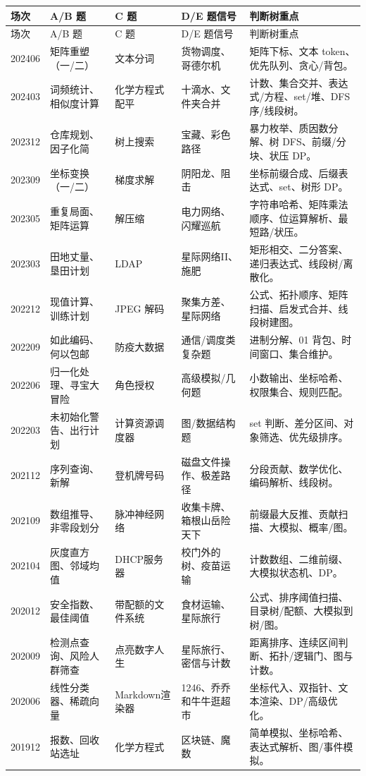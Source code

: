 \begingroup
\small
\setlength{\tabcolsep}{3pt}
\begin{longtable}{p{1.55cm}p{2.8cm}p{2.8cm}p{3.35cm}p{4.6cm}}
\toprule
场次 & A/B 题 & C 题 & D/E 题信号 & 判断树重点 \\
\midrule
\endfirsthead
\toprule
场次 & A/B 题 & C 题 & D/E 题信号 & 判断树重点 \\
\midrule
\endhead
202406 & 矩阵重塑（一/二） & 文本分词 & 货物调度、哥德尔机 & 矩阵下标、文本 token、优先队列、贪心/背包。 \\
202403 & 词频统计、相似度计算 & 化学方程式配平 & 十滴水、文件夹合并 & 计数、集合交并、表达式/方程、set/堆、DFS 序/线段树。 \\
202312 & 仓库规划、因子化简 & 树上搜索 & 宝藏、彩色路径 & 暴力枚举、质因数分解、树 DFS、前缀/分块、状压 DP。 \\
202309 & 坐标变换（一/二） & 梯度求解 & 阴阳龙、阻击 & 坐标前缀合成、后缀表达式、set、树形 DP。 \\
202305 & 重复局面、矩阵运算 & 解压缩 & 电力网络、闪耀巡航 & 字符串哈希、矩阵乘法顺序、位运算解析、最短路/状压。 \\
202303 & 田地丈量、垦田计划 & LDAP & 星际网络II、施肥 & 矩形相交、二分答案、递归表达式、线段树/离散化。 \\
202212 & 现值计算、训练计划 & JPEG 解码 & 聚集方差、星际网络 & 公式、拓扑顺序、矩阵扫描、启发式合并、线段树建图。 \\
202209 & 如此编码、何以包邮 & 防疫大数据 & 通信/调度类复杂题 & 进制分解、01 背包、时间窗口、集合维护。 \\
202206 & 归一化处理、寻宝大冒险 & 角色授权 & 高级模拟/几何题 & 小数输出、坐标哈希、权限集合、规则匹配。 \\
202203 & 未初始化警告、出行计划 & 计算资源调度器 & 图/数据结构题 & set 判断、差分区间、对象筛选、优先级排序。 \\
202112 & 序列查询、新解 & 登机牌号码 & 磁盘文件操作、极差路径 & 分段贡献、数学优化、编码解析、线段树。 \\
202109 & 数组推导、非零段划分 & 脉冲神经网络 & 收集卡牌、箱根山岳险天下 & 前缀最大反推、贡献扫描、大模拟、概率/图。 \\
202104 & 灰度直方图、邻域均值 & DHCP服务器 & 校门外的树、疫苗运输 & 计数数组、二维前缀、大模拟状态机、DP。 \\
202012 & 安全指数、最佳阈值 & 带配额的文件系统 & 食材运输、星际旅行 & 公式、排序阈值扫描、目录树/配额、大模拟到树/图。 \\
202009 & 检测点查询、风险人群筛查 & 点亮数字人生 & 星际旅行、密信与计数 & 距离排序、连续区间判断、拓扑/逻辑门、图与计数。 \\
202006 & 线性分类器、稀疏向量 & Markdown渲染器 & 1246、乔乔和牛牛逛超市 & 坐标代入、双指针、文本渲染、DP/高级优化。 \\
201912 & 报数、回收站选址 & 化学方程式 & 区块链、魔数 & 简单模拟、坐标哈希、表达式解析、图/事件模拟。 \\
\bottomrule
\end{longtable}
\endgroup

